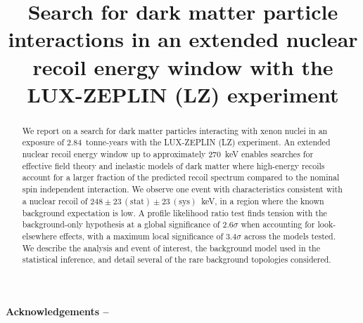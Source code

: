 \documentclass[aps, prl, reprint, superscriptaddress, amsmath, amssymb, preprintnumbers, nobibnotes, nofootinbib]{revtex4-2}
\begin{document}
{
\title{Search for dark matter particle interactions in an extended nuclear recoil  energy window with the LUX-ZEPLIN (LZ) experiment}



\begin{abstract}
We report on a search for dark matter particles interacting with xenon nuclei in an exposure of 2.84~tonne-years with the LUX-ZEPLIN (LZ) experiment. 
An extended nuclear recoil energy window up to approximately 270~keV enables searches for effective field theory and inelastic models of dark matter where high-energy recoils account for a larger fraction of the predicted recoil spectrum compared to the nominal spin independent interaction.
We observe one event with characteristics consistent with a nuclear recoil of $248\pm23\,\mathrm{(stat)}\pm23\,\mathrm{(sys)}$~keV, in a region where the known background expectation is low. 
A profile likelihood ratio test finds tension with the background-only hypothesis at a global significance of 2.6$\sigma$ when accounting for look-elsewhere effects, with a maximum local significance of 3.4$\sigma$ across the models tested. 
We describe the analysis and event of interest, the background model used in the statistical inference, and detail several of the rare background topologies considered.  
\end{abstract}

\maketitle
}
\thispagestyle{fancy}















\paragraph{\label{sec:acknowledgements}Acknowledgements --}









\clearpage
\onecolumngrid
\appendix

\end{document}
